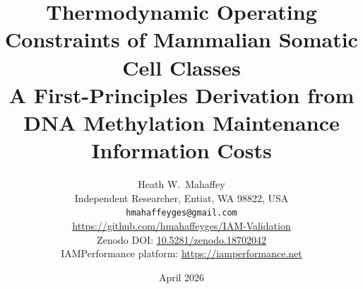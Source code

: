 \documentclass[12pt,a4paper]{article}
\begin{document}
\emergencystretch=20pt

\title{\textbf{Thermodynamic Operating Constraints of Mammalian Somatic Cell Classes}\\[6pt]
A First-Principles Derivation from DNA Methylation Maintenance Information Costs}

\author{
  Heath W.\ Mahaffey\\[4pt]
  \small Independent Researcher, Entiat, WA 98822, USA\\[2pt]
  \small \texttt{hmahaffeyges@gmail.com}\\[2pt]
  \small \url{https://github.com/hmahaffeyges/IAM-Validation}\\[1pt]
  \small Zenodo DOI: \href{https://doi.org/10.5281/zenodo.18702042}{10.5281/zenodo.18702042}\\[1pt]
  \small IAMPerformance platform: \url{https://iamperformance.net}
}

\date{April 2026}
\maketitle
\thispagestyle{empty}

\vspace{0.2cm}
\end{document}
